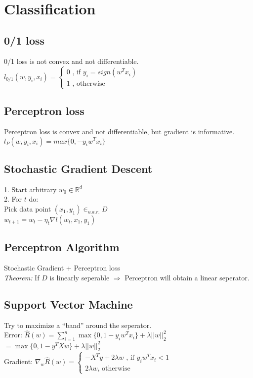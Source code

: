 \section*{Classification}
\subsection*{0/1 loss}
0/1 loss is not convex and not differentiable.\\
$l_{0/1} (w,y_i,x_i) = \left\{
	\begin{array}{lr}
		0 \text{ , if } y_i = sign(w^Tx_i)\\
		1 \text{ , otherwise} 
	\end{array}$

\subsection*{Perceptron loss}
Perceptron loss is convex and not differentiable, but gradient is informative.\\
$l_{P} (w,y_i,x_i) = max\{0, -y_i w^T x_i \}$

\subsection*{Stochastic Gradient Descent}
1. Start arbitrary $w_0 \in \mathbb{R}^d$\\
2. For $t$ do: \\
	Pick data point $(x_1,y_1) \in_{u.a.r.} D$\\
	$w_{t+1} = w_t - \eta_t \nabla l(w_t,x_1,y_1)$

\subsection*{Perceptron Algorithm}
Stochastic Gradient + Perceptron loss\\

\emph{Theorem:} If $D$ is linearly seperable $\Rightarrow$ Perceptron will obtain a linear seperator.

\subsection*{Support Vector Machine}
Try to maximize a ``band'' around the seperator.\\
Error: $\hat{R}(w) = \sum_{i=1}^n \max \{0,1-y_i w^T x_i\} + \lambda ||w||_2^2$\\
$= \max \{0,1-y^T X w\} + \lambda ||w||_2^2$\\
Gradient: $\nabla_w \hat{R}(w) = \left\{
	\begin{array}{lr}
		-X^Ty + 2\lambda w \text{ , if $y_iw^Tx_i<1$}\\
		2\lambda w \text{, otherwise}
	\end{array}$

